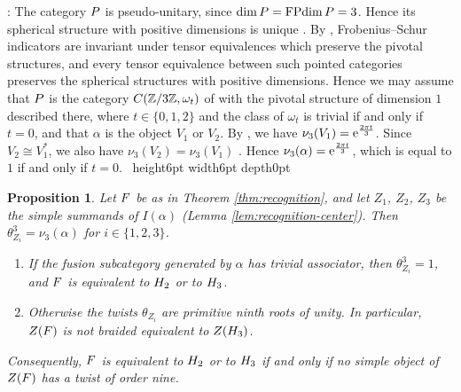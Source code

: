 \documentclass[leqno]{article}
\let\cal\relax
\newcommand{\cal}{\mathcal}
\newcommand{\Z}{\ensuremath{\mathbb{Z}}}
\newcommand{\qed}{\hfill \vrule height6pt  width6pt depth0pt}
\let\i\relax %
\newcommand{\i}{\mathrm{i}}
\newcommand{\e}{\mathrm{e}} %
\newtheorem{prop}[thm]{Proposition}
\newenvironment{proof}[1][]{\noindent {\it Proof #1} : }{\hbox{~}\qed
\smallskip
}
\numberwithin{equation}{section}
\begin{document}
\begin{proof}
The category $\cal P$ is pseudo-unitary, since $\dim \cal P = \operatorname{FPdim} \cal P = 3$. Hence its spherical structure with positive dimensions is unique \cite[Proposition 8.23 p.~34]{ENO05}. By \cite[Corollary 4.4 p.~11]{NS07b}, Frobenius--Schur indicators are invariant under tensor equivalences which preserve the pivotal structures, and every tensor equivalence between such pointed categories preserves the spherical structures with positive dimensions. Hence we may assume that $\cal P$ is the category $\cal C(\Z/3\Z,\omega_t)$ of \cite[p.~30]{NS07} with the pivotal structure of dimension $1$ described there, where $t \in \{0,1,2\}$ and the class of $\omega_t$ is trivial if and only if $t = 0$, and that $\alpha$ is the object $V_1$ or $V_2$. By \cite[p.~31]{NS07}, we have $\nu_3(V_1) = \e^{\frac{2\pi\i t}{3}}$. Since $V_2 \cong V_1^*$, we also have $\nu_3(V_2) = \nu_3(V_1)$ \cite[Remark 4.2 p.~10]{NS07}. Hence $\nu_3(\alpha) = \e^{\frac{2\pi\i t}{3}}$, which is equal to $1$ if and only if $t = 0$.
\end{proof}

\begin{prop}
\label{prop:twisted}
Let $\cal F$ be as in Theorem \ref{thm:recognition}, and let $Z_1$, $Z_2$, $Z_3$ be the simple summands of $I(\alpha)$ (Lemma \ref{lem:recognition-center}). Then $\theta_{Z_i}^3 = \nu_3(\alpha)$ for $i \in \{1,2,3\}$.
\begin{enumerate}
\item If the fusion subcategory generated by $\alpha$ has trivial associator, then $\theta_{Z_i}^3 = 1$, and $\cal F$ is equivalent to $\cal H_2$ or to $\cal H_3$.
\item Otherwise the twists $\theta_{Z_i}$ are primitive ninth roots of unity. In particular, $Z(\cal F)$ is not braided equivalent to $Z(\cal H_3)$.
\end{enumerate}
Consequently, $\cal F$ is equivalent to $\cal H_2$ or to $\cal H_3$ if and only if no simple object of $Z(\cal F)$ has a twist of order nine.
\end{prop}
\end{document}

